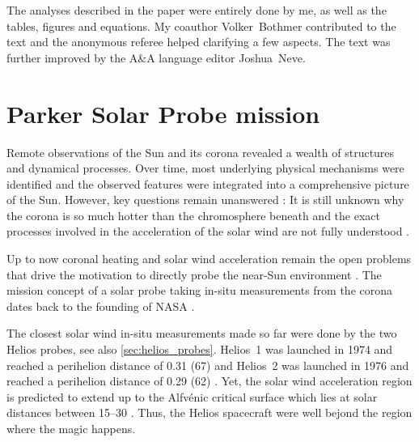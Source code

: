 The analyses described in the paper were entirely done by me, as well as the tables, figures and equations. My coauthor Volker~Bothmer contributed to the text and the anonymous referee helped clarifying a few aspects. The text was further improved by the A\&A language editor Joshua~Neve.\\


\section{Parker Solar Probe mission}
Remote observations of the Sun and its corona revealed a wealth of structures and dynamical processes. Over time, most underlying physical mechanisms were identified and the observed features were integrated into a comprehensive picture of the Sun. However, key questions remain unanswered \citep{McComas2007}: It is still unknown why the corona is so much hotter than the chromosphere beneath \citep{Klimchuk2006} and the exact processes involved in the acceleration of the solar wind are not fully understood \citep{Hollweg1985,Cranmer2017}.

Up to now coronal heating and solar wind acceleration remain the open problems that drive the motivation to directly probe the near-Sun environment \citep{McComas2007,Fox2015}. The mission concept of a solar probe taking in-situ measurements from the corona dates back to the founding of NASA \citep{McComas200807}.

The closest solar wind in-situ measurements made so far were done by the two Helios probes, see also \autoref{sec:helios_probes}. Helios~1 was launched in 1974 and reached a perihelion distance of \SI{0.31}{\au} (\SI{67}{\Rs}) and Helios~2 was launched in 1976 and reached a perihelion distance of \SI{0.29}{\au} (\SI{62}{\Rs}) \citep{Rosenbauer1977}. Yet, the solar wind acceleration region is predicted to extend up to the Alfvénic critical surface which lies at solar distances between \SIrange{15}{30}{\Rs} \citep{Katsikas2010,Goelzer2014}. Thus, the Helios spacecraft were well bejond the region where the magic happens.

